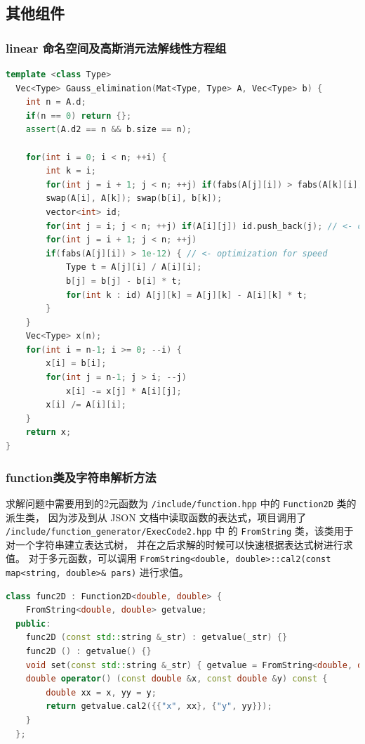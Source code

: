 \documentclass[lang=cn,a4paper,newtx,bibend=bibtex]{elegantpaper}
\begin{document}
\subsection{其他组件}

\subsubsection{linear 命名空间及高斯消元法解线性方程组}

\begin{lstlisting}[language = C++]
  template <class Type>
  Vec<Type> Gauss_elimination(Mat<Type, Type> A, Vec<Type> b) {
    int n = A.d;
    if(n == 0) return {};
    assert(A.d2 == n && b.size == n);

    for(int i = 0; i < n; ++i) {
        int k = i;
        for(int j = i + 1; j < n; ++j) if(fabs(A[j][i]) > fabs(A[k][i])) k = j;
        swap(A[i], A[k]); swap(b[i], b[k]);
        vector<int> id;
        for(int j = i; j < n; ++j) if(A[i][j]) id.push_back(j); // <- optimization for speed
        for(int j = i + 1; j < n; ++j)
        if(fabs(A[j][i]) > 1e-12) { // <- optimization for speed
            Type t = A[j][i] / A[i][i];
            b[j] = b[j] - b[i] * t;
            for(int k : id) A[j][k] = A[j][k] - A[i][k] * t;
        }
    }
    Vec<Type> x(n);
    for(int i = n-1; i >= 0; --i) {
        x[i] = b[i];
        for(int j = n-1; j > i; --j)
            x[i] -= x[j] * A[i][j];
        x[i] /= A[i][i];
    }
    return x;
}
\end{lstlisting}

\subsubsection{function类及字符串解析方法}

求解问题中需要用到的2元函数为 \texttt{/include/function.hpp} 中的 \texttt{Function2D} 类的派生类，
因为涉及到从 JSON 文档中读取函数的表达式，项目调用了 \texttt{/include/function\_generator/ExecCode2.hpp} 中
的 \texttt{FromString} 类，该类用于对一个字符串建立表达式树，
并在之后求解的时候可以快速根据表达式树进行求值。
对于多元函数，可以调用 \texttt{FromString<double, double>::cal2(const map<string, double>\& pars)} 进行求值。

\begin{lstlisting}[language = C++]
  class func2D : Function2D<double, double> {
    FromString<double, double> getvalue;
  public:
    func2D (const std::string &_str) : getvalue(_str) {}
    func2D () : getvalue() {}
    void set(const std::string &_str) { getvalue = FromString<double, double>(_str); }
    double operator() (const double &x, const double &y) const {
        double xx = x, yy = y;
        return getvalue.cal2({{"x", xx}, {"y", yy}});
    }
  };
\end{lstlisting}
\end{document}
